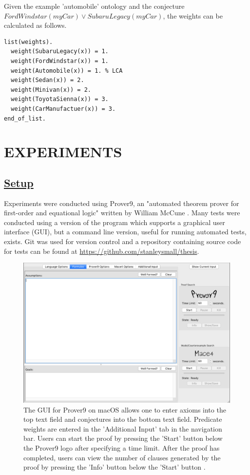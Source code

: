 \documentclass{article}
\begin{document}
Given the example 'automobile' ontology and the conjecture $FordWindstar(myCar) \lor SubaruLegacy(myCar)$,   the weights can be calculated as follows. 

\begin{singlespace}
\begin{verbatim}
list(weights).
  weight(SubaruLegacy(x)) = 1. 
  weight(FordWindstar(x)) = 1. 
  weight(Automobile(x)) = 1. % LCA
  weight(Sedan(x)) = 2. 
  weight(Minivan(x)) = 2. 
  weight(ToyotaSienna(x)) = 3. 
  weight(CarManufactuer(x)) = 3. 
end_of_list.
\end{verbatim}
\end{singlespace}

\newpage
\vspace*{.05in}
\section{\MakeUppercase{Experiments}}

\subsection{\underline{Setup}}

Experiments were conducted using Prover9, an "automated theorem prover for first-order and equational logic" written by William McCune \cite{mccune2005prover9}. Many tests were conducted using a version of the program which supports a graphical user interface (GUI), but a command line version, useful for running automated tests, exists. 
Git was used for version control and a repository containing source code for tests can be found at \url{https://github.com/stanleysmall/thesis}.
\begin{figure}[h]
\centering
\includegraphics[width=6in]{prover9}
\caption[Prover9 GUI]{The GUI for Prover9 on macOS allows one to enter axioms into the top text field and conjectures into the bottom text field. Predicate weights are entered in the 'Additional Input' tab in the navigation bar. Users can start the proof by pressing the 'Start' button below the Prover9 logo after specifying a time limit. After the proof has completed, users can view the number of clauses generated by the proof by pressing the 'Info' button below the 'Start' button \cite{mccune2005prover9}.}
\label{fig:prover9}
\end{figure}
\end{document}
